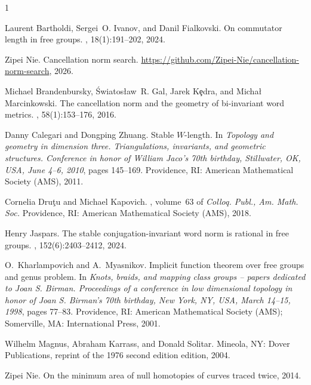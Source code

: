 \documentclass[12pt,reqno,a4paper]{article}
\theoremstyle{definition}
\theoremstyle{remark}
\numberwithin{equation}{section}
\numberwithin{figure}{section}
\begin{document}
\begin{thebibliography}{1}

Laurent Bartholdi, Sergei~O. Ivanov, and Danil Fialkovski.
\newblock On commutator length in free groups.
, 18(1):191--202, 2024.

Zipei Nie.
\newblock Cancellation norm search.
\newblock \url{https://github.com/Zipei-Nie/cancellation-norm-search}, 2026.

Michael Brandenbursky, {\'S}wiatos{\l}aw~R. Gal, Jarek K{\c{e}}dra, and
  Micha{\l} Marcinkowski.
\newblock The cancellation norm and the geometry of bi-invariant word metrics.
, 58(1):153--176, 2016.

Danny Calegari and Dongping Zhuang.
\newblock Stable {{\(W\)}}-length.
\newblock In {\em Topology and geometry in dimension three. Triangulations,
  invariants, and geometric structures. Conference in honor of William Jaco's
  70th birthday, Stillwater, OK, USA, June 4--6, 2010}, pages 145--169.
  Providence, RI: American Mathematical Society (AMS), 2011.

Cornelia Dru{\c{t}}u and Michael Kapovich.
,
  volume~63 of {\em Colloq. Publ., Am. Math. Soc.}
\newblock Providence, RI: American Mathematical Society (AMS), 2018.

Henry Jaspars.
\newblock The stable conjugation-invariant word norm is rational in free
  groups.
, 152(6):2403--2412, 2024.

O.~Kharlampovich and A.~Myasnikov.
\newblock Implicit function theorem over free groups and genus problem.
\newblock In {\em Knots, braids, and mapping class groups -- papers dedicated
  to Joan S. Birman. Proceedings of a conference in low dimensional topology in
  honor of Joan S. Birman's 70th birthday, New York, NY, USA, March 14--15,
  1998}, pages 77--83. Providence, RI: American Mathematical Society (AMS);
  Somerville, MA: International Press, 2001.

Wilhelm Magnus, Abraham Karrass, and Donald Solitar.
\newblock Mineola, NY: Dover Publications, reprint of the 1976 second edition
  edition, 2004.

Zipei Nie.
\newblock On the minimum area of null homotopies of curves traced twice, 2014.

\end{thebibliography}
\end{document}
